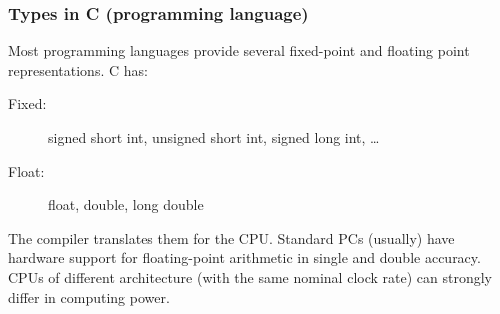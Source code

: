 \begin{vbframe}
\frametitle{Types in C (programming language)}
Most programming languages provide several fixed-point and floating point representations. C has:
\begin{description}
\item[Fixed:] signed short int, unsigned short int, signed long int, \ldots
\item[Float:] float, double, long double
\end{description}
The compiler translates them for the CPU. Standard PCs (usually) have hardware support for floating-point arithmetic in
single and double accuracy. CPUs of different architecture
(with the same nominal clock rate) can strongly differ in
computing power.



%
%
%


\end{vbframe}


